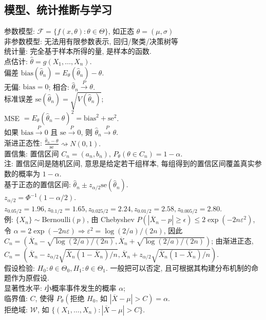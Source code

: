 \documentclass[titlepage, a4paper, landscape]{article}
\begin{document}
\begin{multicols}{4}
\section{模型、统计推断与学习}
参数模型: $\mathcal{F}=\{f(x, \theta) : \theta \in \Theta\}$, 如正态 $\theta = (\mu, \sigma)$\\
非参数模型: 无法用有限参数表示, 回归/聚类/决策树等\\
统计量: 完全基于样本所得的量, 是样本的函数. \\
点估计: $\hat \theta = g(X_1, \dots, X_n)$. \\
偏差 $\mathrm{bias}(\hat \theta_n) = E_\theta(\hat \theta_n) - \theta$. \\
无偏: $\mathrm{bias} = 0$; 相合: $\hat \theta_n \xrightarrow{P} \theta$. \\
标准误差 $\mathrm{se}(\hat \theta_n) = \sqrt{V(\hat \theta_n)}$; \\
MSE $ = E_\theta(\hat \theta_n - \theta)^2 = \mathrm{bias}^2 + \mathrm{se}^2$. \\
如果 $\mathrm{bias}\xrightarrow{P} 0$ 且 $\mathrm{se}\xrightarrow{P} 0$, 则 $\hat \theta_n \xrightarrow{P} \theta$. \\	
渐进正态性: $\frac{\hat\theta_n - \theta}{\mathrm{se}} \rightsquigarrow N(0, 1).$ \\
置信集: 置信区间 $C_n = (a_n, b_n)$, $P_\theta(\theta \in C_n) = 1 - \alpha$. \\
注: 置信区间是随机区间, 意思是给定若干组样本, 每组得到的置信区间覆盖真实参数的概率为 $1 - \alpha$. \\
基于正态的置信区间: $\hat \theta_n \pm z_{\alpha/2} \mathrm{se}(\hat \theta_n)$. \\
$z_{\alpha/2} = \Phi^{-1}(1 - \alpha / 2)$. $z_{0.05/2} = 1.96, z_{0.1/2} = 1.65, z_{0.025/2} = 2.24, z_{0.01/2}=2.58, z_{0.005/2}=2.80$. \\
例: $\{X_n\} \sim \mathrm{Bernoulli}(p)$, 
由 Chebyshev $P(|\overline X_n - p| \geq \epsilon) \leq 2 \exp(-2n\varepsilon^2)$, 令 $\alpha= 2\exp(-2n\varepsilon) \Rightarrow \varepsilon ^ 2 = \log(2/a)/(2n)$, 因此 $C_n = (\overline X_n - \sqrt{\log(2/a)/(2n)}, \overline X_n + \sqrt{\log(2/a)/(2n)})$;
由渐进正态, $C_n = (\overline X_n - z_{\alpha/2} \sqrt{\overline X_n(1 - \overline X_n)/n}, \overline X_n + z_{\alpha/2} \sqrt{\overline X_n(1 - \overline X_n)/n})$. \\
假设检验: $H_0: \theta \in \Theta_0, H_1: \theta \in \Theta_1$. 一般把可以否定, 且可根据其构建分布机制的命题作为原假设. \\
显著性水平: 小概率事件发生的概率 $\alpha$; \\
临界值: $C$, 使得 $P_\theta(\text{拒绝 $H_0$, 如 $|\overline X - \mu| > C$}) = \alpha$.\\
拒绝域: $\mathcal{W}$, 如 $\{ (X_1, \dots, X_n) : |\overline X - \mu| > C\}$.\\

\end{multicols}
\end{document}
